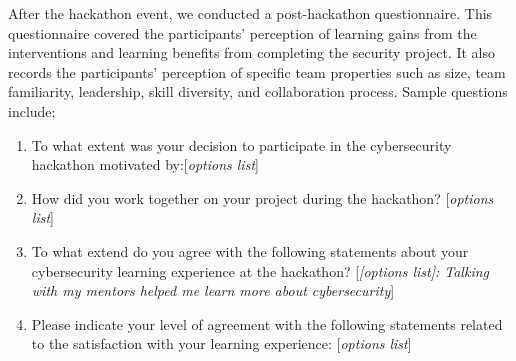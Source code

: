 \documentclass[runningheads]{llncs}
\begin{document}
After the hackathon event, we conducted a post-hackathon questionnaire. This questionnaire covered the participants' perception of learning gains from the interventions and learning benefits from completing the security project. It also records the participants' perception of specific team properties such as size, team familiarity, leadership, skill diversity, and collaboration process.
Sample questions include; 
\begin{enumerate}
    \item To what extent was your decision to participate in the cybersecurity hackathon motivated by:[\textit{options list}]
    \item How did you work together on your project during the hackathon? [\textit{options list}]
    \item To what extend do you agree with the following statements about your cybersecurity learning experience at the hackathon? [\textit{[options list]: Talking with my mentors helped me learn more about cybersecurity}]
    \item Please indicate your level of agreement with the following statements related to the satisfaction with your learning experience: [\textit{options list}]
\end{enumerate}
\end{document}
